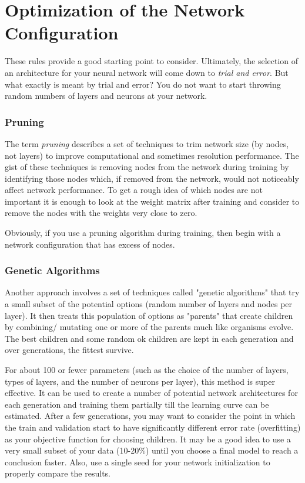 \documentclass[]{scrartcl}
\begin{document}
\section{Optimization of the Network Configuration}

These rules provide a good starting point to consider. Ultimately, the selection of an architecture for your neural network will come down to \emph{trial and error}. 
But what exactly is meant by trial and error? You do not want to start throwing random numbers of layers and neurons at your network. 

\subsubsection*{Pruning}
The term \emph{pruning} describes a set of techniques to trim network size (by nodes, not layers) to improve computational and sometimes resolution performance. 
The gist of these techniques is removing nodes from the network during training by identifying those nodes which, if removed from the network, would not noticeably affect network performance. To get a rough idea of which nodes are not important it is enough to look at the weight matrix after training and consider to remove the nodes with the weights very close to zero. 

Obviously, if you use a pruning algorithm during training, then begin with a network configuration that has excess of nodes.


\subsubsection*{Genetic Algorithms}

Another approach involves a set of techniques called "genetic algorithms" that try a small subset of the potential options (random number of layers and nodes per layer). It then treats this population of options as "parents" that create children by combining/ mutating one or more of the parents much like organisms evolve. The best children and some random ok children are kept in each generation and over generations, the fittest survive.

For about 100 or fewer parameters (such as the choice of the number of layers, types of layers, and the number of neurons per layer), this method is super effective. It can be used to create a number of potential network architectures for each generation and training them partially till the learning curve can be estimated. After a few generations, you may want to consider the point in which the train and validation start to have significantly different error rate (overfitting) as your objective function for choosing children. It may be a good idea to use a very small subset of your data (10-20\%) until you choose a final model to reach a conclusion faster. Also, use a single seed for your network initialization to properly compare the results.
\end{document}
